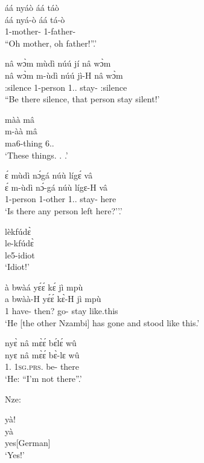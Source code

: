 \begin{exe}[(N234)]
\exN\label{n174}
  \glll áá nyáò áá táò \\
       áá nyá-ò áá tá-ò \\
       {\EXCL} {\N}1-mother-{\VOC} {\EXCL} {\N}1-father-{\VOC}  \\
    \trans ``Oh mother, oh father!''.'
 
\exN\label{n175}
  \glll nâ wɔ̀m mùdì núú jí nâ wɔ̀m\\
       nâ wɔ̀m m-ùdì núú jì-H nâ wɔ̀m\\
        {\COMP} {\IDEO}:silence {\N}1-person 1.{\DEM}.{\DIST} stay-{\R} {\COMP} {\IDEO}:silence\\
    \trans ``Be there silence, that person stay silent!'
 
\exN\label{n176}
  \glll màà mâ \\
      m-àà mâ \\
        ma6-thing 6.{\DEM}.{\PROX} \\
    \trans `These things. . .'
 
\exN\label{n177}
  \glll ɛ́ mùdì nɔ́gá núù lígɛ́ vâ \\
       ɛ́ m-ùdì nɔ́-gá núù lígɛ-H vâ \\
       {\LOC} {\N}1-person 1-other 1.{\DEM}.{\PROX} stay-{\R} here  \\
    \trans `Is there any person left here?''.'
 
\exN\label{n178}
  \glll lèkfúdɛ̀  \\
        le-kfúdɛ̀  \\
       le5-idiot  \\
    \trans `Idiot!'
 
\exN\label{n179} 
  \glll à bwàá yɛ́ɛ́ kɛ́ jì mpù \\
       a bwàà-H yɛ́ɛ́ kɛ̀-H jì mpù \\
        1 have-{\R} then? go-{\R} stay like.this \\
    \trans `He [the other Nzambi] has gone and stood like this.'
 
\exN\label{n180}
  \glll nyɛ̀ nâ mɛ̀ɛ́ bɛ́lɛ́ wû \\
       nyɛ nâ mɛ̀ɛ́ bɛ̀-lɛ wû \\
        1.{\SBJ}  {\COMP} 1\textsc{sg}.\textsc{prs}.{\NEG} be-{\NEG} there \\
    \trans `He: ``I'm not there''.'
\end{exe}

\noindent Nze: 
\begin{exe}[(N234)] 
\exN\label{n181}
  \glll yà! \\
         yà \\
        yes[German] \\
    \trans `Yes!'
\end{exe}

